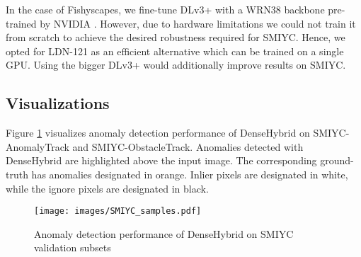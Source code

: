 \documentclass[runningheads]{llncs}
\begin{document}
In the case of Fishyscapes, we fine-tune DLv3+ with a WRN38 backbone pre-trained by NVIDIA \cite{zhu19cvpr}.
However, due to hardware limitations we could not train it from scratch to achieve the desired robustness required for SMIYC.
Hence, we opted for LDN-121 as an efficient alternative which can be trained on a single GPU.
Using the bigger DLv3+ would additionally improve results on SMIYC.





\subsection{Visualizations}

Figure \ref{fig:smiyc_more} visualizes anomaly detection performance of DenseHybrid on SMIYC-AnomalyTrack and SMIYC-ObstacleTrack.
Anomalies detected with DenseHybrid are highlighted above the input image.
The corresponding ground-truth has anomalies designated in orange. 
Inlier pixels are designated in white, while the ignore pixels are designated in black.

\begin{figure}
    \centering
    \texttt{[image: images/SMIYC\_samples.pdf]}
    \caption{Anomaly detection performance of DenseHybrid on SMIYC validation subsets}
    \label{fig:smiyc_more}
\end{figure}
\end{document}
